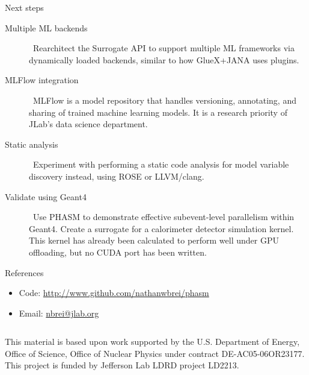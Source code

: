 \documentclass[final]{beamer}
\newlength{\onecolwid}
\begin{document}
\begin{frame}[fragile,t]
\begin{columns}[t]
\begin{column}{\onecolwid}
\begin{block}{Next steps}

\begin{description}
\item[Multiple ML backends]\ Rearchitect the Surrogate API to support multiple ML frameworks via dynamically loaded backends, similar to how GlueX+JANA uses plugins.

\item[MLFlow integration]\ MLFlow is a model repository that handles versioning, annotating, and sharing of trained machine learning models. It is a research priority of JLab’s data science department.

\item[Static analysis]\ Experiment with performing a static code analysis for model variable discovery instead, using ROSE or LLVM/clang. 

\item[Validate using Geant4]\ Use PHASM to demonstrate effective subevent-level parallelism within Geant4. Create a surrogate for a calorimeter detector simulation kernel. This kernel has already been calculated to perform well under GPU offloading, but no CUDA port has been written.

\end{description}

\end{block}



\begin{block}{References}
\begin{itemize}
\item Code: \href{http://www.github.com/nathanwbrei/phasm}{http://www.github.com/nathanwbrei/phasm}
\item Email: \href{mailto:nbrei@jlab.org}{nbrei@jlab.org}
\end{itemize}
\end{block}




\end{column} %

\end{columns} %


\footnotesize{This material is based upon work supported by the U.S. Department of Energy, Office of Science, Office of Nuclear Physics under contract DE-AC05-06OR23177. This project is funded by Jefferson Lab LDRD project LD2213.}

\end{frame}
\end{document}
